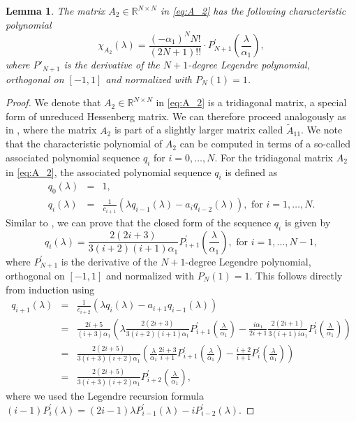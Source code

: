 \documentclass[a4paper, 11pt]{article}
\newtheorem{lemma}{Lemma}
\begin{document}
\begin{lemma}\label{lemma:A_2_chi}
    The matrix $A_2 \in \mathbb{R}^{N \times N}$ in \eqref{eq:A_2} has the following characteristic polynomial
    \begin{equation}\label{eq:A_2_char_poly}
        \chi_{A_2}(\lambda) = \frac{(-\alpha_1)^NN!}{(2N+1)!!} \cdot P^{'}_{N+1}\left(\frac{\lambda}{\alpha_1}\right),
    \end{equation}
    where $P'_{N+1}$ is the derivative of the $N+1$-degree Legendre polynomial, orthogonal on $[-1,1]$ and normalized with $P_{N}(1)=1$.
\end{lemma}
\begin{proof}
    We denote that $A_2 \in \mathbb{R}^{N\times N}$ in \eqref{eq:A_2} is a tridiagonal matrix, a special form of unreduced Hessenberg matrix. We can therefore proceed analogously as in \cite{Bauerle2025}, where the matrix $A_2$ is part of a slightly larger matrix called $\tilde{A}_{11}$. We note that the characteristic polynomial of $A_2$ can be computed in terms of a so-called associated polynomial sequence $q_i$ for $i=0,\ldots, N$. For the tridiagonal matrix $A_2$ in \eqref{eq:A_2}, the associated polynomial sequence $q_i$ is defined as
    \begin{eqnarray}
        q_0(\lambda) &=& 1, \label{eq:q_sequence1}\\
        q_i(\lambda) &=& \frac{1}{c_{i+1}} \left( \lambda q_{i-1}(\lambda) - a_i q_{i-2}(\lambda) \right), \textrm{ for } i=1,\ldots, N. \label{eq:q_sequence2}
    \end{eqnarray}
    Similar to \cite{Bauerle2025}, we can prove that the closed form of the sequence $q_i$ is given by
    \begin{equation}
        q_i(\lambda) = \frac{2(2i+3)}{3(i+2)(i+1)\alpha_1} P^{'}_{i+1}\left(\frac{\lambda}{\alpha_1}\right), \textrm{ for } i=1,\ldots, N-1,
    \end{equation}
    where $P^{'}_{N+1}$ is the derivative of the $N+1$-degree Legendre polynomial, orthogonal on $[-1,1]$ and normalized with $P_{N}(1)=1$. This follows directly from induction using
    \begin{eqnarray}
        q_{i+1}(\lambda) &=& \frac{1}{c_{i+2}} \left( \lambda q_{i}(\lambda) - a_{i+1} q_{i-1}(\lambda) \right) \\
        &=& \frac{2i+5}{(i+3) \alpha_1} \!\left( \!\lambda \frac{2(2i+3)}{3(i+2)(i+1)\alpha_1} P^{'}_{i+1}\!\left(\frac{\lambda}{\alpha_1}\right) \!-\! \frac{i \alpha_1}{2i+1} \frac{2(2i+1)}{3(i+1) i \alpha_1} P^{'}_{i}\!\left(\frac{\lambda}{\alpha_1}\right) \!\right) \\
        &=& \frac{2(2i+5)}{3(i+3)(i+2) \alpha_1} \!\left(\! \frac{\lambda}{\alpha_1} \frac{2i+3}{i+1} P^{'}_{i+1}\!\left(\frac{\lambda}{\alpha_1}\right) \!- \!\frac{i+2}{i+1} P^{'}_{i}\left(\frac{\lambda}{\alpha_1}\right) \right) \\
        &=& \frac{2(2i+5)}{3(i+3)(i+2)\alpha_1} P^{'}_{i+2}\!\left(\frac{\lambda}{\alpha_1}\right),
    \end{eqnarray}
    where we used the Legendre recursion formula $(i-1) P^{'}_i(\lambda) = (2i-1) \lambda P^{'}_{i-1} (\lambda)- i P^{'}_{i-2}(\lambda)$.


\end{proof}
\end{document}
